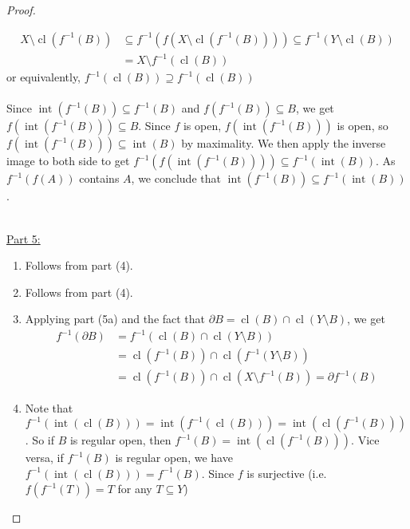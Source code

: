 \documentclass{treatise}
\begin{document}
\begin{proof}
\begin{enumerate}[label=(\alph*)]
    \begin{align*}
        X \setminus \operatorname{cl}(f^{-1}(B)) & \subseteq f^{-1}(f(X \setminus \operatorname{cl}(f^{-1}(B)))) \subseteq f^{-1}(Y \setminus \operatorname{cl}(B))
        \\
        & = X \setminus f^{-1}(\operatorname{cl}(B))
    \end{align*}
    or equivalently, $f^{-1}(\operatorname{cl}(B)) \supseteq f^{-1}(\operatorname{cl}(B))$
    \\
    \\
    Since $\operatorname{int}(f^{-1}(B)) \subseteq f^{-1}(B)$ and $f(f^{-1}(B)) \subseteq B$, we get $f(\operatorname{int}(f^{-1}(B))) \subseteq B$. Since $f$ is open, $f(\operatorname{int}(f^{-1}(B)))$ is open, so $f(\operatorname{int}(f^{-1}(B))) \subseteq \operatorname{int}(B)$ by maximality. We then apply the inverse image to both side to get $f^{-1}(f(\operatorname{int}(f^{-1}(B)))) \subseteq f^{-1}(\operatorname{int}(B))$. As $f^{-1}(f(A))$ contains $A$, we conclude that $\operatorname{int}(f^{-1}(B)) \subseteq f^{-1}(\operatorname{int}(B))$.
\end{enumerate}
\ 
\\
\underline{Part 5:}
\begin{enumerate}[label=(\alph*)]
    \item Follows from part (4).
    \item Follows from part (4).
    \item Applying part (5a) and the fact that $\partial B = \operatorname{cl}(B) \cap \operatorname{cl}(Y \setminus B)$, we get
    \begin{align*}
        f^{-1}(\partial B) & = f^{-1}(\operatorname{cl}(B) \cap \operatorname{cl}(Y \setminus B))
        \\
        & = \operatorname{cl}(f^{-1}(B)) \cap \operatorname{cl}(f^{-1}(Y \setminus B))
        \\
        & = \operatorname{cl}(f^{-1}(B)) \cap \operatorname{cl}(X \setminus f^{-1}(B)) = \partial f^{-1}(B)
    \end{align*}
    \item Note that $f^{-1}(\operatorname{int}(\operatorname{cl}(B))) = \operatorname{int}(f^{-1}(\operatorname{cl}(B))) = \operatorname{int}(\operatorname{cl}(f^{-1}(B)))$. So if $B$ is regular open, then $f^{-1}(B) = \operatorname{int}(\operatorname{cl}(f^{-1}(B)))$. Vice versa, if $f^{-1}(B)$ is regular open, we have $f^{-1}(\operatorname{int}(\operatorname{cl}(B))) = f^{-1}(B)$. Since $f$ is surjective (i.e. $f(f^{-1}(T)) = T$ for any $T \subseteq Y$)

\end{enumerate}
\end{proof}
\end{document}
